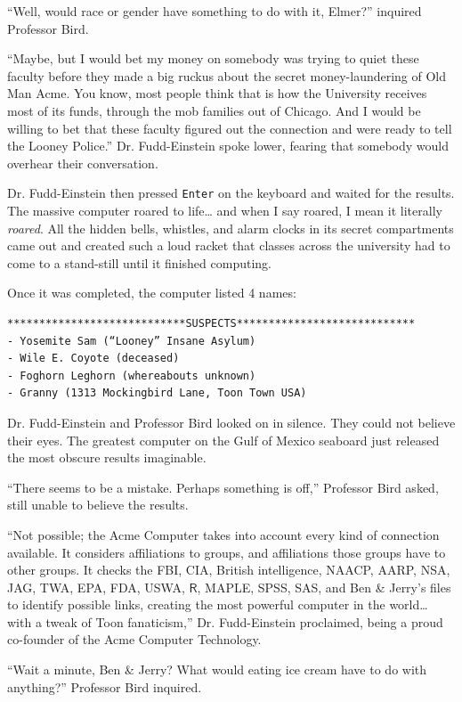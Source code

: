 \documentclass[captions=tableheading]{scrbook}
\begin{document}
\begin{example}
“Well, would race or gender have something to do with it, Elmer?” inquired Professor Bird.

“Maybe, but I would bet my money on somebody was trying to quiet these faculty before they made a big ruckus about the secret money-laundering of Old Man Acme. You know, most people think that is how the University receives most of its funds, through the mob families out of Chicago. And I would be willing to bet that these faculty figured out the connection and were ready to tell the Looney Police.” Dr. Fudd-Einstein spoke lower, fearing that somebody would overhear their conversation.  

Dr. Fudd-Einstein then pressed \texttt{Enter} on the keyboard and waited for the results. The massive computer roared to life\ldots{} and when I say roared, I mean it literally \emph{roared}. All the hidden bells, whistles, and alarm clocks in its secret compartments came out and created such a loud racket that classes across the university had to come to a stand-still until it finished computing. 

Once it was completed, the computer listed 4 names:


\begin{verbatim}
****************************SUSPECTS****************************
- Yosemite Sam (“Looney” Insane Asylum) 
- Wile E. Coyote (deceased) 
- Foghorn Leghorn (whereabouts unknown) 
- Granny (1313 Mockingbird Lane, Toon Town USA)
\end{verbatim}

Dr. Fudd-Einstein and Professor Bird looked on in silence. They could not believe their eyes. The greatest computer on the Gulf of Mexico seaboard just released the most obscure results imaginable.

“There seems to be a mistake. Perhaps something is off,” Professor Bird asked, still unable to believe the results.

“Not possible; the Acme Computer takes into account every kind of connection available. It considers affiliations to groups, and affiliations those groups have to other groups. It checks the FBI, CIA, British intelligence, NAACP, AARP, NSA, JAG, TWA, EPA, FDA, USWA, \(\mathsf{R}\), MAPLE, SPSS, SAS, and Ben \& Jerry’s files to identify possible links, creating the most powerful computer in the world\ldots{} with a tweak of Toon fanaticism,” Dr. Fudd-Einstein proclaimed, being a proud co-founder of the Acme Computer Technology.

“Wait a minute, Ben \& Jerry? What would eating ice cream have to do with anything?” Professor Bird inquired.


\end{example}
\end{document}
